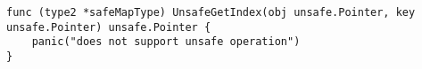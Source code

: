 \begin{lstlisting}[language=Golang, label=lst:labels-classexample-unused, caption=Usage class example: unused]
func (type2 *safeMapType) UnsafeGetIndex(obj unsafe.Pointer, key unsafe.Pointer) unsafe.Pointer {
    panic("does not support unsafe operation")
}
\end{lstlisting}